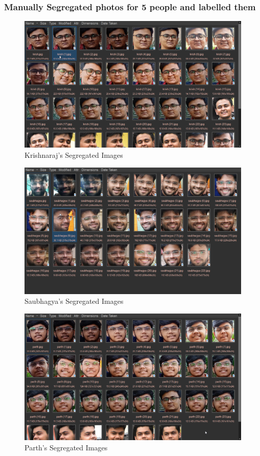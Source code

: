 \documentclass[openany]{report}
\begin{document}
\subsubsection{Manually Segregated photos for 5 people and labelled them}
\begin{figure}[H]
    \centering
    \includegraphics[width=.95\textwidth]{imgs/krishnaraj.png}
    \caption{Krishnaraj's Segregated Images}
\end{figure}
\begin{figure}[H]
    \centering
    \includegraphics[width=.95\textwidth]{imgs/saubhagya.png}
    \caption{Saubhagya's Segregated Images}
\end{figure}
\begin{figure}[H]
    \centering
    \includegraphics[width=.95\textwidth]{imgs/parth.png}
    \caption{Parth's Segregated Images}
\end{figure}
\end{document}
